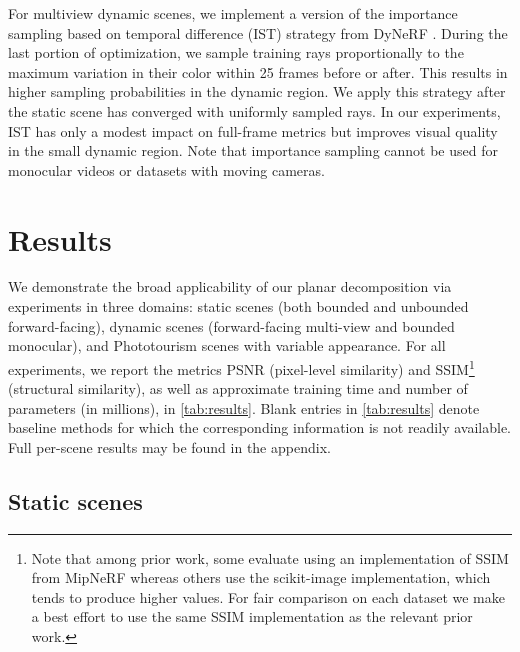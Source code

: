 \documentclass[10pt,twocolumn,letterpaper]{article}
\makeatletter
\renewcommand{\paragraph}{\@startsection{paragraph}{4}{\z@}{0.65ex \@plus 1ex \@minus .2ex}{-1em}{\normalfont \normalsize \bfseries }}
\makeatother
\begin{document}
\paragraph{Importance sampling.}
For multiview dynamic scenes, we implement a version of the importance sampling based on temporal difference (IST) strategy from DyNeRF \cite{dynerf}. During the last portion of optimization, we sample training rays proportionally to the maximum variation in their color within 25 frames before or after. This results in higher sampling probabilities in the dynamic region. We apply this strategy after the static scene has converged with uniformly sampled rays. In our experiments, IST has only a modest impact on full-frame metrics but improves visual quality in the small dynamic region. Note that importance sampling cannot be used for monocular videos or datasets with moving cameras.
 
\section{Results}\label{sec:results}

We demonstrate the broad applicability of our planar decomposition via experiments in three domains: static scenes (both bounded  and unbounded forward-facing), dynamic scenes (forward-facing multi-view and bounded  monocular), and Phototourism scenes with variable appearance. For all experiments, we report the metrics PSNR (pixel-level similarity) and SSIM\footnote{Note that among prior work, some evaluate using an implementation of SSIM from MipNeRF \cite{mipnerf} whereas others use the scikit-image implementation, which tends to produce higher values. For fair comparison on each dataset we make a best effort to use the same SSIM implementation as the relevant prior work.}~\cite{ssim} (structural similarity), as well as approximate training time and number of parameters (in millions), in \cref{tab:results}. Blank entries in \cref{tab:results} denote baseline methods for which the corresponding information is not readily available. Full per-scene results may be found in the appendix.

\subsection{Static scenes}\label{sec:static}
\end{document}
